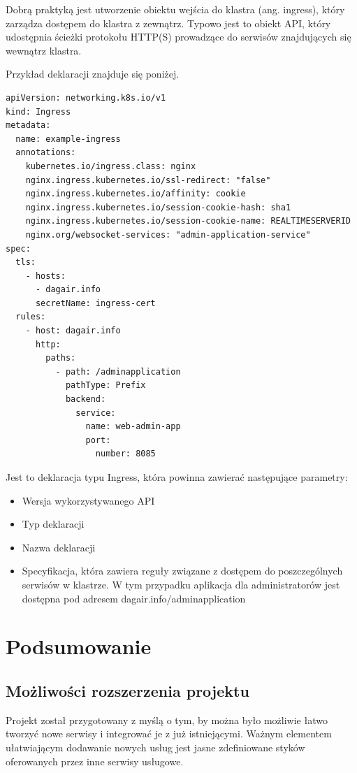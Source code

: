 \documentclass[11pt, a4]{article} %
\begin{document}
Dobrą praktyką jest utworzenie obiektu wejścia do klastra (ang. ingress), który 
zarządza dostępem do klastra z zewnątrz. Typowo jest to obiekt API, który udostępnia 
ścieżki protokołu HTTP(S) prowadzące do serwisów znajdujących się wewnątrz klastra.

Przykład deklaracji znajduje się poniżej.

\begin{lstlisting}
apiVersion: networking.k8s.io/v1
kind: Ingress
metadata:
  name: example-ingress
  annotations:
    kubernetes.io/ingress.class: nginx
    nginx.ingress.kubernetes.io/ssl-redirect: "false"
    nginx.ingress.kubernetes.io/affinity: cookie
    nginx.ingress.kubernetes.io/session-cookie-hash: sha1
    nginx.ingress.kubernetes.io/session-cookie-name: REALTIMESERVERID
    nginx.org/websocket-services: "admin-application-service"
spec:
  tls:
    - hosts:
      - dagair.info
      secretName: ingress-cert
  rules:
    - host: dagair.info
      http:
        paths:
          - path: /adminapplication
            pathType: Prefix
            backend:
              service:
                name: web-admin-app
                port:
                  number: 8085
\end{lstlisting}

Jest to deklaracja typu Ingress, która powinna zawierać następujące parametry:

\begin{itemize} %
    \item Wersja wykorzystywanego API
    \item Typ deklaracji
    \item Nazwa deklaracji
    \item Specyfikacja, która zawiera reguły związane z dostępem do poszczególnych 
    serwisów w klastrze. W tym przypadku aplikacja dla administratorów jest dostępna 
    pod adresem dagair.info/adminapplication
\end{itemize}

\section{Podsumowanie}
\subsection{Możliwości rozszerzenia projektu}

Projekt został przygotowany z myślą o tym, by można było możliwie łatwo tworzyć nowe 
serwisy i integrować je z już istniejącymi. Ważnym elementem ułatwiającym dodawanie 
nowych usług jest jasne zdefiniowane styków oferowanych przez inne serwisy usługowe. 
\end{document}
